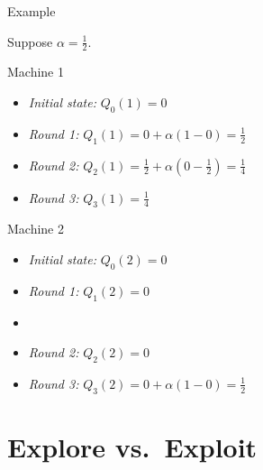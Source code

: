 \documentclass[11pt]{beamer}
\begin{document}
\begin{frame}{Example}

Suppose $\alpha=\frac{1}{2}$.

\vspace{\baselineskip}

\begin{minipage}{.5\linewidth}
\begin{center}
Machine 1
\end{center}

\begin{itemize}
\item<1-> \textit{Initial state:} $Q_0(1) = 0$
\item<2-> \textit{Round 1:} $Q_1(1) = 0 + \alpha(1 - 0) = \frac{1}{2}$
\item<3-> \textit{Round 2:} $Q_2(1) = \frac{1}{2} + \alpha(0 - \frac{1}{2})= \frac{1}{4}$
\item<4-> \textit{Round 3:} $Q_3(1) = \frac{1}{4}$
\end{itemize}
\end{minipage}\begin{minipage}{.5\linewidth}
\begin{center}
Machine 2
\end{center}

\begin{itemize}
\item<1-> \textit{Initial state:} $Q_0(2) = 0$
\item<2->  \textit{Round 1:} $Q_1(2) = 0$
\item[]
\item<3-> \textit{Round 2:} $Q_2(2) = 0$
\item<4-> \textit{Round 3:} $Q_3(2) = 0 + \alpha(1 - 0) = \frac{1}{2}$
\end{itemize}
\end{minipage}

\vfill


\vspace{\baselineskip}

\end{frame}



\section{Explore vs.~Exploit}
\end{document}
